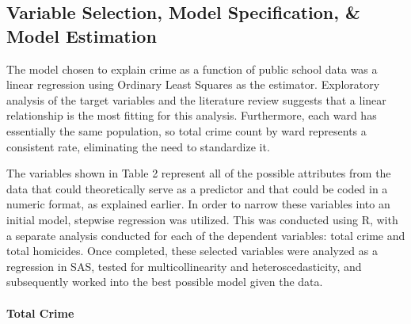 \documentclass[12pt]{article}
\begin{document}
\subsection{Variable Selection, Model Specification, \& Model Estimation}

The model chosen to explain crime as a function of public school data was a linear regression using Ordinary Least Squares as the estimator.  Exploratory analysis of the target variables and the literature review suggests that a linear relationship is the most fitting for this analysis.  Furthermore, each ward has essentially the same population, so total crime count by ward represents a consistent rate, eliminating the need to standardize it.

\par

The variables shown in Table 2 represent all of the possible attributes from the data that could theoretically serve as a predictor and that could be coded in a numeric format, as explained earlier.  In order to narrow these variables into an initial model, stepwise regression was utilized.  This was conducted using R, with a separate analysis conducted for each of the dependent variables:  total crime and total homicides.  Once completed, these selected variables were analyzed as a regression in SAS, tested for multicollinearity and heteroscedasticity, and  subsequently worked into the best possible model given the data.

\paragraph{Total Crime}
\end{document}
